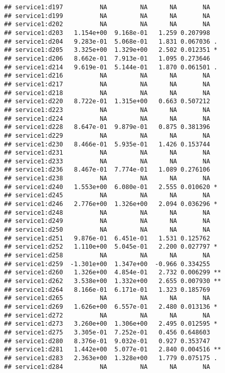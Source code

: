 \documentclass[
]{article}
\begin{document}
\begin{verbatim}
## service1:d197          NA         NA      NA       NA    
## service1:d199          NA         NA      NA       NA    
## service1:d202          NA         NA      NA       NA    
## service1:d203   1.154e+00  9.168e-01   1.259 0.207998    
## service1:d204   9.283e-01  5.068e-01   1.831 0.067036 .  
## service1:d205   3.325e+00  1.329e+00   2.502 0.012351 *  
## service1:d206   8.662e-01  7.913e-01   1.095 0.273646    
## service1:d214   9.619e-01  5.144e-01   1.870 0.061501 .  
## service1:d216          NA         NA      NA       NA    
## service1:d217          NA         NA      NA       NA    
## service1:d218          NA         NA      NA       NA    
## service1:d220   8.722e-01  1.315e+00   0.663 0.507212    
## service1:d223          NA         NA      NA       NA    
## service1:d224          NA         NA      NA       NA    
## service1:d228   8.647e-01  9.879e-01   0.875 0.381396    
## service1:d229          NA         NA      NA       NA    
## service1:d230   8.466e-01  5.935e-01   1.426 0.153744    
## service1:d231          NA         NA      NA       NA    
## service1:d233          NA         NA      NA       NA    
## service1:d236   8.467e-01  7.774e-01   1.089 0.276106    
## service1:d238          NA         NA      NA       NA    
## service1:d240   1.553e+00  6.080e-01   2.555 0.010620 *  
## service1:d245          NA         NA      NA       NA    
## service1:d246   2.776e+00  1.326e+00   2.094 0.036296 *  
## service1:d248          NA         NA      NA       NA    
## service1:d249          NA         NA      NA       NA    
## service1:d250          NA         NA      NA       NA    
## service1:d251   9.876e-01  6.451e-01   1.531 0.125762    
## service1:d252   1.110e+00  5.045e-01   2.200 0.027797 *  
## service1:d258          NA         NA      NA       NA    
## service1:d259  -1.301e+00  1.347e+00  -0.966 0.334255    
## service1:d260   1.326e+00  4.854e-01   2.732 0.006299 ** 
## service1:d262   3.538e+00  1.332e+00   2.655 0.007930 ** 
## service1:d264   8.166e-01  6.171e-01   1.323 0.185769    
## service1:d265          NA         NA      NA       NA    
## service1:d269   1.626e+00  6.557e-01   2.480 0.013136 *  
## service1:d272          NA         NA      NA       NA    
## service1:d273   3.260e+00  1.306e+00   2.495 0.012595 *  
## service1:d275   3.305e-01  7.252e-01   0.456 0.648603    
## service1:d280   8.376e-01  9.032e-01   0.927 0.353747    
## service1:d281   1.442e+00  5.077e-01   2.840 0.004516 ** 
## service1:d283   2.363e+00  1.328e+00   1.779 0.075175 .  
## service1:d284          NA         NA      NA       NA    

\end{verbatim}
\end{document}
